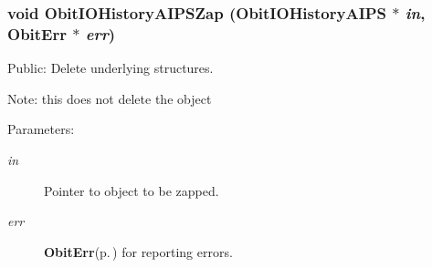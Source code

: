 \subsubsection{\setlength{\rightskip}{0pt plus 5cm}void Obit\-IOHistory\-AIPSZap ({\bf Obit\-IOHistory\-AIPS} $\ast$ {\em in}, {\bf Obit\-Err} $\ast$ {\em err})}\label{ObitIOHistoryAIPS_8c_a13}


Public: Delete underlying structures. 

Note: this does not delete the object \begin{Desc}
\item[Parameters:]
\begin{description}
\item[{\em in}]Pointer to object to be zapped. \item[{\em err}]{\bf Obit\-Err}{\rm (p.\,\pageref{structObitErr})} for reporting errors. \end{description}
\end{Desc}
